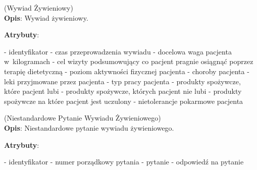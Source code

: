 \begin{enumerate}[label={\textbf{KAT/5/\protect\twodigits{\theenumi}}}, wide, labelwidth=!, labelindent=0pt, labelsep=0pt, series=reqs]
    \label{kat:NutritionalInterview} (Wywiad Żywieniowy)\\
    \indent\textbf{Opis}: Wywiad żywieniowy.
    \par
    \textbf{Atrybuty}:
    \begin{itemize}[series=atr, wide, align=left, leftmargin=190pt]
        \label{kat:NutritionalInterview:id}- identyfikator
        \label{kat:NutritionalInterview:completionDate}- czas przeprowadzenia wywiadu
        \label{kat:NutritionalInterview:targetWeight}- docelowa waga pacjenta w~kilogramach
        \label{kat:NutritionalInterview:advicePurpose}- cel wizyty podsumowujący co pacjent pragnie osiągnąć poprzez terapię dietetyczną
        \label{kat:NutritionalInterview:physicalActivity}- poziom aktywności fizycznej pacjenta
        \label{kat:NutritionalInterview:diseases}- choroby pacjenta
        \label{kat:NutritionalInterview:medicines}- leki przyjmowane przez pacjenta
        \label{kat:NutritionalInterview:jobType}- typ pracy pacjenta
        \label{kat:NutritionalInterview:likedProducts}- produkty spożywcze, które pacjent lubi
        \label{kat:NutritionalInterview:dislikedProducts}- produkty spożywcze, których pacjent nie lubi
        \label{kat:NutritionalInterview:foodAllergies}- produkty spożywcze na które pacjent jest uczulony
        \label{kat:NutritionalInterview:foodIntolerances}- nietolerancje pokarmowe pacjenta
    \end{itemize}

    \label{kat:CustomNutritionalInterviewQuestion} (Niestandardowe Pytanie Wywiadu Żywieniowego)\\
    \indent\textbf{Opis}: Niestandardowe pytanie wywiadu żywieniowego.
    \par
    \textbf{Atrybuty}:
    \begin{itemize}[series=atr, wide, align=left, leftmargin=190pt]
        \label{kat:CustomNutritionalInterviewQuestion:id}- identyfikator
        \label{kat:CustomNutritionalInterviewQuestion:ordinalNumber}- numer porządkowy pytania
        \label{kat:CustomNutritionalInterviewQuestion:question}- pytanie
        \label{kat:CustomNutritionalInterviewQuestion:answer}- odpowiedź na pytanie
    \end{itemize}


\end{enumerate}
